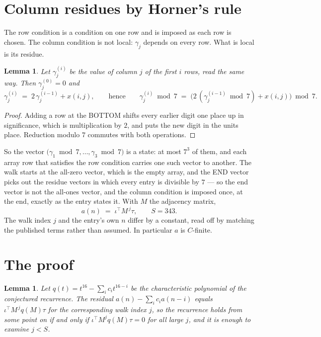 \documentclass[11pt,a4paper]{article}
\theoremstyle{plain}
\newtheorem{lemma}[theorem]{Lemma}
\theoremstyle{definition}
\begin{document}
\section{Column residues by Horner's rule}

The row condition is a condition on one row and is imposed as each row is chosen. The column
condition is not local: $\gamma_j$ depends on every row. What is local is its residue.

\begin{lemma}\label{lem:horner}
Let $\gamma_j^{(i)}$ be the value of column $j$ of the first $i$ rows, read the same way.
Then $\gamma_j^{(0)}=0$ and
\[
\gamma_j^{(i)}\;=\;2\,\gamma_j^{(i-1)}+x(i,j),
\qquad\text{hence}\qquad
\gamma_j^{(i)}\bmod 7\;=\;
\bigl(2\,(\gamma_j^{(i-1)}\bmod 7)+x(i,j)\bigr)\bmod 7 .
\]
\end{lemma}

\begin{proof}
Adding a row at the BOTTOM shifts every earlier digit one place up in significance, which is
multiplication by $2$, and puts the new digit in the units place. Reduction modulo
$7$ commutes with both operations.
\end{proof}

So the vector $\bigl(\gamma_1\bmod 7,\dots,\gamma_{3}\bmod
7\bigr)$ is a state: at most $7^{3}$ of them, and each array row
that satisfies the row condition carries one such vector to another. The walk starts at the
all-zero vector, which is the empty array, and the END vector picks out the residue vectors in
which every entry is divisible by $7$ --- so the end vector is not the all-ones
vector, and the column condition is imposed once, at the end, exactly as the entry states it.
With $M$ the adjacency matrix,
\[
a(n)\;=\;\iota^{\!\top}M^{\,j}\tau ,\qquad S=343.
\]
The walk index $j$ and the entry's own $n$ differ by a constant, read off by matching the
published terms rather than assumed. In particular $a$ is $C$-finite.

\section{The proof}

\begin{lemma}\label{lem:crit}
Let $q(t)=t^{16}-\sum_i c_it^{16-i}$ be the characteristic polynomial of the
conjectured recurrence. The residual $a(n)-\sum_ic_ia(n-i)$ equals
$\iota^{\!\top}M^{\,j}q(M)\tau$ for the corresponding walk index $j$, so the recurrence
holds from some point on if and only if $\iota^{\!\top}M^{j}q(M)\tau=0$ for all large $j$,
and it is enough to examine $j<S$.
\end{lemma}
\end{document}
